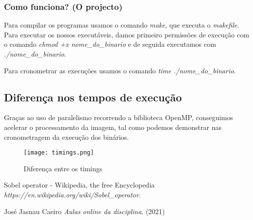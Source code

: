 \documentclass{article}
\begin{document}
\subsubsection{Como funciona? (O projecto)}

Para compilar os programas usamos o comando \textit{make}, que executa o \textit{makefile}.
Para executar os nossos executáveis, damos primeiro permissões de execução com o comando \textit{chmod +x nome\_do\_binario} e de seguida executamos com \textit{./nome\_do\_binario}.

Para cronometrar as execuções usamos o comando \textit{time ./nome\_do\_binario}.

\subsection{Diferença nos tempos de execução}
Graças ao uso de paralelismo recorrendo a biblioteca OpenMP, conseguimos acelerar o processamento da imagem, tal como podemos demonstrar nas cronometragem da execução dos binários.

\begin{figure}[!htb]
\centering
\texttt{[image: timings.png]}
\caption{Diferença entre os timings}
\label{fig:timings}
\end{figure}

\newpage


\begin{thebibliography}{9}
Sobel operator - Wikipedia, the free Encyclopedia
\textit{https://en.wikipedia.org/wiki/Sobel\_operator}.

José Jasnau Caeiro
\textit{Aulas online da disciplina}. (2021)

\end{thebibliography}
\end{document}
